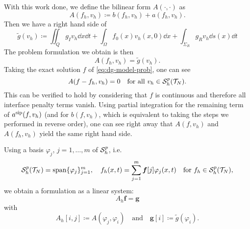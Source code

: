 \documentclass[../thesis.tex]{subfiles}
\begin{document}
With this work done, we define the bilinear form $A(\cdot, \cdot)$ as
\[
	A(f_h, v_h) \coloneqq b(f_h, v_h) + a(f_h, v_h).
\]
Then we have a right hand side of
\[
	\tilde{g}(v_h) \coloneqq \iint_Q g_I v_h \dd x \dd t + \int_\Omega f_0(x) v_h(x, 0) \dd x + \int_{\Sigma_R} g_R v_h \dd s(x) \dd t 
\]
The problem formulation we obtain is then
\begin{equation}
\label{eq:dg-discrete-form}
	A(f_h, v_h) = \tilde{g}(v_h).
\end{equation}
Taking the exact solution $f$ of \cref{eq:dg-model-prob}, one can see
\begin{equation}
\label{eq:dg-Galerkin-orthogonality}
	A(f - f_h, v_h) = 0 \quad \text{for all } v_h \in \mathcal{S}_h^p(\mathcal{T}_N).
\end{equation}
This can be verified to hold by considering that $f$ is continuous and therefore all interface penalty terms vanish. Using partial integration for the remaining term of $a^{\mathrm{sip}}(f, v_h)$ (and for $b(f, v_h)$, which is equivalent to taking the steps we performed in reverse order), one can see right away that $A(f, v_h)$ and $A(f_h, v_h)$ yield the same right hand side.

Using a basis $\varphi_j$, $j = 1, \ldots, m$ of $\mathcal{S}_h^p$, i.e.
\[
	\mathcal{S}_h^p(\mathcal{T}_N) = \operatorname*{span} \{ \varphi_j \}_{j=1}^m, \quad f_h(x, t) = \sum_{j=1}^m \boldsymbol{f}[j] \varphi_j(x, t) \quad \text{for } f_h \in \mathcal{S}_h^p(\mathcal{T}_N),
\]
we obtain a formulation as a linear system:
\begin{equation}
\label{eq:dg-discrete-prob}
	A_h \boldsymbol{f} = \boldsymbol{g}
\end{equation}
with
\[
	A_h[i, j] \coloneqq A(\varphi_j, \varphi_i) \quad \text{and} \quad \boldsymbol{g}[i] \coloneqq \tilde{g}(\varphi_i). 
\]
\end{document}

